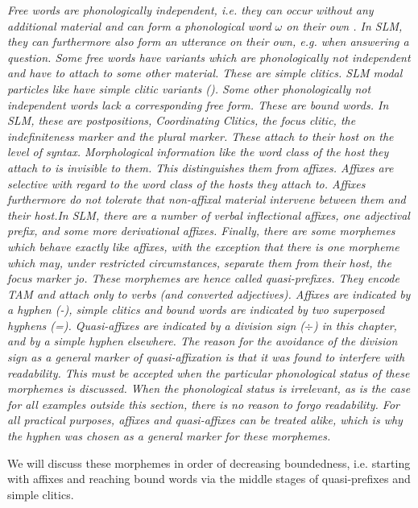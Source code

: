 \em Free words \em are phonologically independent, i.e. they can occur without any additional material and can form a phonological word $\omega$ \citep{NesporEtAl1986} on their own \kuckn. In SLM, they can furthermore also form an utterance on their own, e.g. when answering a question.
Some free words have variants which are phonologically not independent and have to attach to some other material. These are \em simple clitics\em. SLM modal particles like  have simple clitic variants (). Some other phonologically not independent  words lack a corresponding free form. These are \em bound words\em. In SLM, these are postpositions, Coordinating Clitics, the focus clitic, the indefiniteness marker and the plural marker. These attach to their host on the level of syntax. Morphological information like the word class of the host they attach to is invisible to them. This distinguishes them from \em affixes\em. Affixes are selective with regard to the word class of the hosts they  attach to. Affixes furthermore do not tolerate that non-affixal material intervene between them and their host.In SLM, there are a number of verbal inflectional affixes, one adjectival prefix, and some more derivational affixes. Finally, there are some morphemes which behave exactly like affixes, with the exception that there is one morpheme which may, under restricted circumstances, separate them from their host, the focus marker \em jo\em. These morphemes are hence called \em quasi-prefixes\em. They encode TAM and attach only to verbs (and converted adjectives). Affixes are indicated by a hyphen (-), simple clitics and bound words are indicated by two superposed hyphens (=). Quasi-affixes are indicated by a division  sign ($\div$) in this chapter, and by a simple hyphen elsewhere. The reason for the avoidance of the division sign as a general marker of quasi-affixation is that it was found to interfere with readability. This must be accepted when the particular phonological status of these morphemes is discussed. When the phonological status is irrelevant, as is the case for all examples outside this section, there is no reason to forgo readability. For all practical purposes, affixes and quasi-affixes can be treated alike, which is why the hyphen was chosen as a general marker for these morphemes.

We will discuss these morphemes in order of decreasing boundedness, i.e. starting with affixes and reaching bound words via the middle stages of quasi-prefixes and simple clitics.

